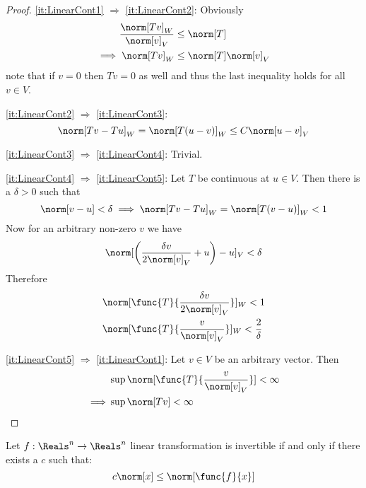 \begin{proof}
    \cref{it:LinearCont1} \(\Rightarrow\) \cref{it:LinearCont2}: Obviously
    \begin{align*}
        \dfrac{\norm[Tv]_W}{\norm[v]_V} & \leq \norm[T]            \\
        \implies \norm[Tv]_W            & \leq \norm[T] \norm[v]_V
    \end{align*}
    note that if \(v = 0\) then \(Tv = 0\) as well and thus the last inequality holds for all \(v \in V\).

    \cref{it:LinearCont2} \(\Rightarrow\) \cref{it:LinearCont3}:
    \begin{equation*}
        \norm[Tv - Tu]_W = \norm[T(u - v)]_W \leq C \norm[u - v]_V
    \end{equation*}

    \cref{it:LinearCont3} \(\Rightarrow\) \cref{it:LinearCont4}: Trivial.

    \cref{it:LinearCont4} \(\Rightarrow\) \cref{it:LinearCont5}: Let \(T\) be continuous at \(u \in V\). Then there is  a \(\delta > 0 \) such that
    \begin{equation*}
        \norm[v-u] < \delta \implies \norm[Tv - Tu]_W = \norm[T(v-u)]_W < 1
    \end{equation*}
    Now for an arbitrary non-zero \(v\) we have
    \begin{equation*}
        \norm[\left( \dfrac{\delta v}{2\norm[v]_V} + u \right) - u]_V < \delta
    \end{equation*}
    Therefore
    \begin{align*}
         & \norm[\func{T}{\dfrac{\delta v}{2\norm[v]_V}}]_W  < 1         \\
         & \norm[\func{T}{\dfrac{v}{\norm[v]_V}}]_W  < \dfrac{2}{\delta}
    \end{align*}

    \cref{it:LinearCont5} \(\Rightarrow\) \cref{it:LinearCont1}: Let \(v \in V\) be an arbitrary vector. Then
    \begin{align*}
                 & \sup \norm[\func{T}{\dfrac{v}{\norm[v]_V}}] < \infty \\
        \implies & \sup \norm[Tv] < \infty
    \end{align*}

\end{proof}

\begin{theorem}
    Let \(f : \Reals^n \to \Reals^n\) linear transformation is invertible if and only if there exists a \(c\) such that:
    \begin{equation*}
        c \norm[x] \leq \norm[\func{f}{x}]
    \end{equation*}
\end{theorem}

